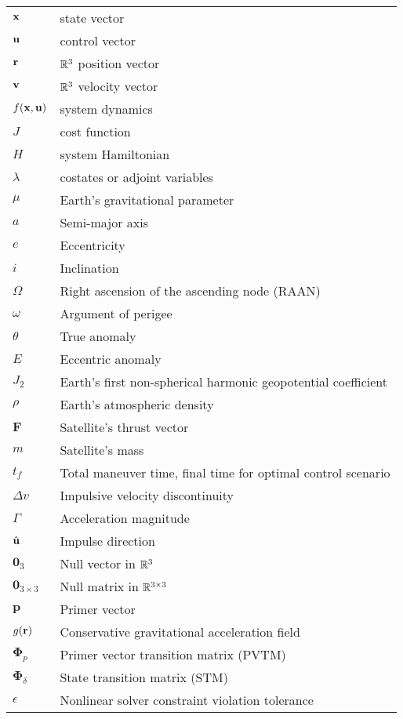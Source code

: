 \begin{longtable}{ll}
\(\mathbf{x}\) & state vector \\
\(\mathbf{u}\) & control vector \\
\(\mathbf{r}\) & \(\mathbb{R}^3\) position vector \\
\(\mathbf{v}\) & \(\mathbb{R}^3\) velocity vector \\
\(f(\mathbf{x}, \mathbf{u})\) & system dynamics \\
\(J\) & cost function \\
\(H\) & system Hamiltonian \\
\(\lambda\) & costates or adjoint variables \\
\(\mu\) & Earth's gravitational parameter \\
\(a\) & Semi-major axis \\
\(e\) & Eccentricity \\
\(i\) & Inclination \\
\(\Omega \) & Right ascension of the ascending node (RAAN) \\
\(\omega \) & Argument of perigee \\
\(\theta \) & True anomaly \\
\(E\) & Eccentric anomaly \\
\(J_2\) & Earth's first non-spherical harmonic geopotential coefficient \\
\(\rho\) & Earth's atmospheric density \\
\(\mathbf{F}\) & Satellite's thrust vector \\
\(m\) & Satellite's mass \\
\(t_f\) & Total maneuver time, final time for optimal control scenario \\
\(\Delta v\) & Impulsive velocity discontinuity \\
\(\Gamma\) & Acceleration magnitude \\
\(\hat{\mathbf{u}}\) & Impulse direction \\
\(\mathbf{0}_3\) & Null vector in \(\mathbb{R}^3\) \\
\(\mathbf{0}_{3 \times 3}\) & Null matrix in \(\mathbb{R}^{3 \times 3}\) \\
\(\mathbf{p}\) & Primer vector \\
\(g(\mathbf{r})\) & Conservative gravitational acceleration field \\
\(\mathbf{\Phi}_p\) & Primer vector transition matrix (PVTM) \\
\(\mathbf{\Phi}_\delta\) & State transition matrix (STM) \\
\(\epsilon\) & Nonlinear solver constraint violation tolerance \\

\end{longtable}
